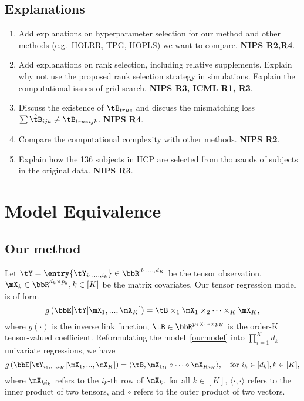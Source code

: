 \documentclass[11pt]{article}
\newcommand{\of}[1]{\left(#1\right)}
\theoremstyle{plain}
\theoremstyle{definition}
\begin{document}
\subsection{Explanations}
\begin{enumerate}
	\item Add explanations on hyperparameter selection for our method and other methods (e.g.\ HOLRR, TPG, HOPLS) we want to compare. {\bf NIPS R2,R4}.
	\item Add explanations on rank selection, including relative supplements. Explain why not use the proposed rank selection strategy in simulations. Explain the computational issues of grid search. {\bf NIPS R3, ICML R1, R3}.
	\item Discuss the existence of $\tB_{true}$ and discuss the mismatching loss $\sum \hat \tB_{ijk} \neq {\tB_{true}}_{ijk}$. {\bf NIPS R4}.
	\item Compare the computational complexity with other methods. {\bf NIPS R2}.
	\item Explain how the 136 subjects in HCP are selected from thousands of subjects in the original data. {\bf NIPS R3}.
\end{enumerate}


\section{Model Equivalence}

\subsection{Our method}
Let $\tY = \entry{\tY_{i_1,...,i_k}} \in \bbR^{d_1,...,d_K}$ be the tensor observation, $\mX_k \in \bbR^{d_k \times p_k}, k \in [K]$ be the matrix covariates. Our tensor regression model is of form
\begin{equation}\label{ourmodel}
	g \of{ \bbE[\tY |\mX_1 ,...,\mX_K ] } = \tB \times_1 \mX_1 \times_2 \cdots \times_K \mX_K,
\end{equation}
where $g(\cdot)$ is the inverse link function, $\tB \in \bbR^{p_1 \times \cdots \times p_K}$ is the order-K tensor-valued coefficient. Reformulating the model~\eqref{ourmodel} into $\prod_{i=1}^K d_k$ univariate regressions, we have
\begin{equation}\label{ourmodel1}
	g \of{ \bbE[\tY_{i_1,...,i_K} |\mX_1 ,...,\mX_K ] }  = \langle \tB, \mX_{1i_1} \circ \cdots \circ \mX_{K i_K}  \rangle, \quad \text{for } i_k \in [d_k], k\in[K],
\end{equation}
where $\mX_{k i_k}$ refers to the $i_k$-th row of $\mX_k$, for all $k \in [K]$, $\langle \cdot, \cdot \rangle$ refers to the inner product of two tensors, and $\circ$ refers to the outer product of two vectors.
\end{document}
